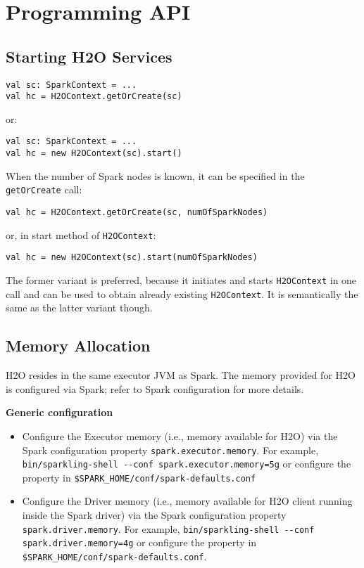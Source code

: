 \section{Programming API}

\subsection{Starting H2O Services}

\begin{lstlisting}[style=Scala]
val sc: SparkContext = ...
val hc = H2OContext.getOrCreate(sc)
\end{lstlisting}
or:
\begin{lstlisting}[style=Scala]
val sc: SparkContext = ...
val hc = new H2OContext(sc).start()
\end{lstlisting}

When the number of Spark nodes is known, it can be specified in the \texttt{getOrCreate} call:

\begin{lstlisting}[style=Scala]
val hc = H2OContext.getOrCreate(sc, numOfSparkNodes)
\end{lstlisting}
or, in start method of \texttt{H2OContext}:

\begin{lstlisting}[style=Scala]
val hc = new H2OContext(sc).start(numOfSparkNodes)
\end{lstlisting}

The former variant is preferred, because it initiates and starts \texttt{H2OContext} in one call and can be used to obtain already existing \texttt{H2OContext}. It is semantically the same as the latter variant though.

\subsection{Memory Allocation}

H2O resides in the same executor JVM as Spark. The memory provided for H2O is configured via Spark; refer to Spark configuration for more details.

\textbf{Generic configuration}

\begin{itemize}
\item Configure the Executor memory (i.e., memory available for H2O) via the Spark configuration property \texttt{spark.executor.memory}. For example, {\lstinline[style=Bash]|bin/sparkling-shell --conf spark.executor.memory=5g|} or configure the property in {\lstinline[style=Bash]|$SPARK_HOME/conf/spark-defaults.conf|}
\item Configure the Driver memory (i.e., memory available for H2O client running inside the Spark driver) via the Spark configuration property \texttt{spark.driver.memory}. For example, {\lstinline[style=Bash]|bin/sparkling-shell --conf spark.driver.memory=4g|} or configure the property in {\lstinline[style=Bash]|$SPARK_HOME/conf/spark-defaults.conf|}.
\end{itemize}

